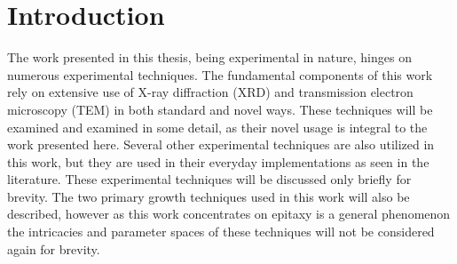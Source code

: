 \section{Introduction}
The work presented in this thesis, being experimental in nature, hinges on numerous experimental techniques.
The fundamental components of this work rely on extensive use of X-ray diffraction (XRD) and transmission electron microscopy (TEM) in both standard and novel ways.
These techniques will be examined and examined in some detail, as their novel usage is integral to the work presented here.
Several other experimental techniques are also utilized in this work, but they are used in their everyday implementations as seen in the literature.
These experimental techniques will be discussed only briefly for brevity.
The two primary growth techniques used in this work will also be described, however as this work concentrates on epitaxy is a general phenomenon the intricacies and parameter spaces of these techniques will not be considered again for brevity.

